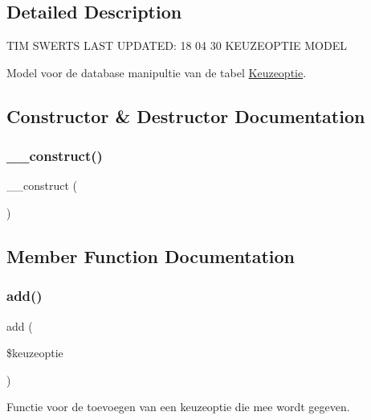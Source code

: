 \subsection{Detailed Description}
T\+IM S\+W\+E\+R\+TS L\+A\+ST U\+P\+D\+A\+T\+ED\+: 18 04 30 K\+E\+U\+Z\+E\+O\+P\+T\+IE M\+O\+D\+EL

Model voor de database manipultie van de tabel \mbox{\hyperlink{class_keuzeoptie}{Keuzeoptie}}. 

\subsection{Constructor \& Destructor Documentation}
\mbox{\label{class_keuzeoptie___model_a095c5d389db211932136b53f25f39685}} 
\subsubsection{\texorpdfstring{\+\_\+\+\_\+construct()}{\_\_construct()}}
{\footnotesize\ttfamily \+\_\+\+\_\+construct (\begin{DoxyParamCaption}{ }\end{DoxyParamCaption})}



\subsection{Member Function Documentation}
\mbox{\label{class_keuzeoptie___model_a2452f524e794bc3f418d60cb296e19b5}} 
\subsubsection{\texorpdfstring{add()}{add()}}
{\footnotesize\ttfamily add (\begin{DoxyParamCaption}\item[{}]{\$keuzeoptie }\end{DoxyParamCaption})}



Functie voor de toevoegen van een keuzeoptie die mee wordt gegeven. 

